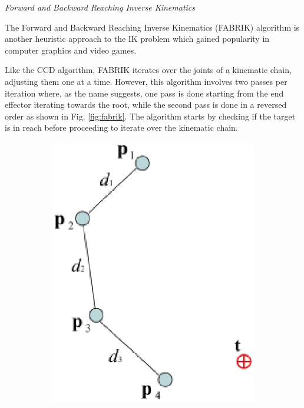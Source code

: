 \noindent\textit{Forward and Backward Reaching Inverse Kinematics}

The Forward and Backward Reaching Inverse Kinematics (FABRIK) algorithm
\cite{Aristidou2011} is another heuristic approach to the IK problem which
gained popularity in computer graphics and video games. 

Like the CCD algorithm, FABRIK iterates over the joints of a kinematic chain,
adjusting them one at a time. However, this algorithm involves two passes per
iteration where, as the name suggests, one pass is done starting from the end
effector iterating towards the root, while the second pass is done in a reversed
order as shown in Fig. \ref{fig:fabrik}. The algorithm starts by checking if the
target is in reach before proceeding to iterate over the kinematic chain. 

\begin{figure}
    \centering
    \captionsetup{justification=centering}
    \begin{subfigure}{0.2\textwidth}
        \centering
        \includegraphics[width=\linewidth]{grafika/fabrik_iteration1.eps}

\end{subfigure}
\end{figure}
